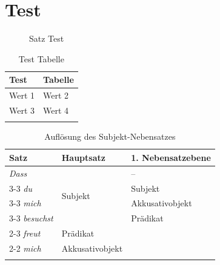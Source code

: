 \chapter{Test}

\begin{figure}
\caption{Satz Test}
\end{figure}

\begin{table}
\begin{tabular}{ll}
\lsptoprule
Test & Tabelle\\\midrule
Wert 1 & Wert 2 \\
Wert 3 & Wert 4\\
\lspbottomrule
\end{tabular}
\caption{Test Tabelle}
\end{table}

\begin{table}[!htbp]
  \centering
  \begin{tabular}{l|l|l}
    \lsptoprule
    {Satz} & \textbf{Hauptsatz} & \textbf{1. Nebensatzebene} \\
    \hline
    \textit{Dass} & \multirow{4}{*}{Subjekt} & -- \\ \cmidrule{3-3}
    \textit{du} & & Subjekt \\ \cmidrule{3-3}
    \textit{mich} & & Akkusativobjekt \\ \cmidrule{3-3}
    \textit{besuchst} & & Prädikat  \\ \cmidrule{2-3}
    \textit{freut} & Prädikat &  \\ \cmidrule{2-2} 
    \textit{mich} & Akkusativobjekt &  \\  
   \lspbottomrule
  \end{tabular}
  \caption{Auflösung des Subjekt-Nebensatzes}
  \label{tab:SubjNS}
\end{table}


